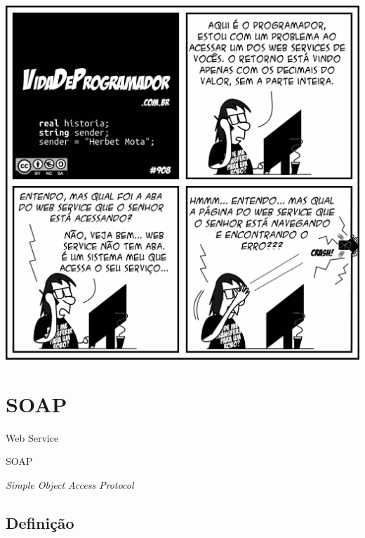 \documentclass[
	9pt, %
	t, %
]{beamer}
\begin{document}
\begin{frame}[plain, c]
	\centering
	\includegraphics[width=0.7\linewidth]{vdp_ws2.png}
\end{frame}


\section{SOAP}

\begin{frame}
	\begin{center}
		
		\bigskip\bigskip\bigskip\bigskip %
		{\Large Web Service}
		
		\bigskip\bigskip %
		{\Huge SOAP}
		
		\smallskip
		{\small \textit{Simple Object Access Protocol}}
	\end{center}

\end{frame}

\subsection{Definição}
\end{document}
